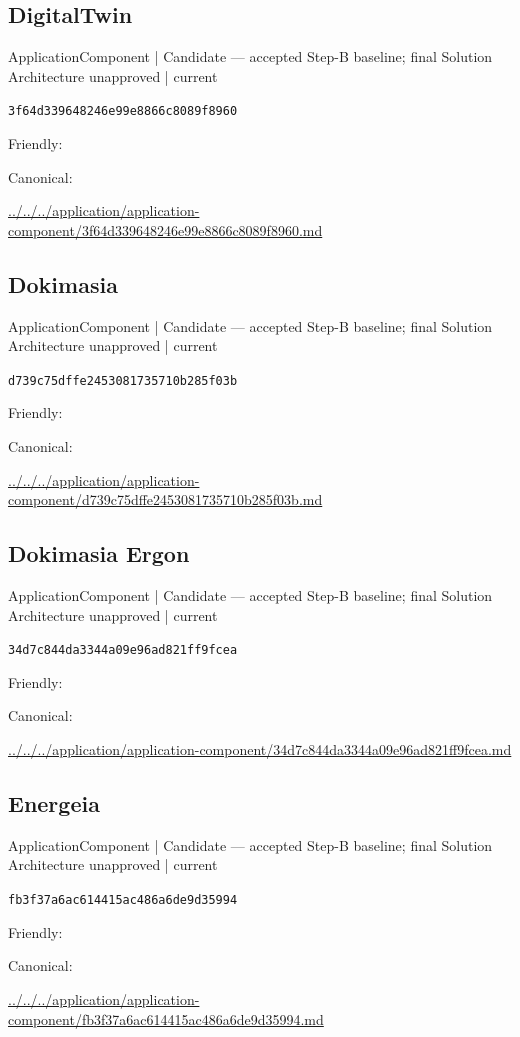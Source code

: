 \documentclass[10pt,a4paper]{article}
\begin{document}
\subsection*{DigitalTwin}
{\small ApplicationComponent | Candidate — accepted Step-B baseline; final Solution Architecture unapproved | current}\par
\texttt{3f64d339648246e99e8866c8089f8960}\par
Friendly: \par
Canonical: \par
{\footnotesize\url{../../../application/application-component/3f64d339648246e99e8866c8089f8960.md}}\par
\subsection*{Dokimasia}
{\small ApplicationComponent | Candidate — accepted Step-B baseline; final Solution Architecture unapproved | current}\par
\texttt{d739c75dffe2453081735710b285f03b}\par
Friendly: \par
Canonical: \par
{\footnotesize\url{../../../application/application-component/d739c75dffe2453081735710b285f03b.md}}\par
\subsection*{Dokimasia Ergon}
{\small ApplicationComponent | Candidate — accepted Step-B baseline; final Solution Architecture unapproved | current}\par
\texttt{34d7c844da3344a09e96ad821ff9fcea}\par
Friendly: \par
Canonical: \par
{\footnotesize\url{../../../application/application-component/34d7c844da3344a09e96ad821ff9fcea.md}}\par
\subsection*{Energeia}
{\small ApplicationComponent | Candidate — accepted Step-B baseline; final Solution Architecture unapproved | current}\par
\texttt{fb3f37a6ac614415ac486a6de9d35994}\par
Friendly: \par
Canonical: \par
{\footnotesize\url{../../../application/application-component/fb3f37a6ac614415ac486a6de9d35994.md}}\par
\end{document}
